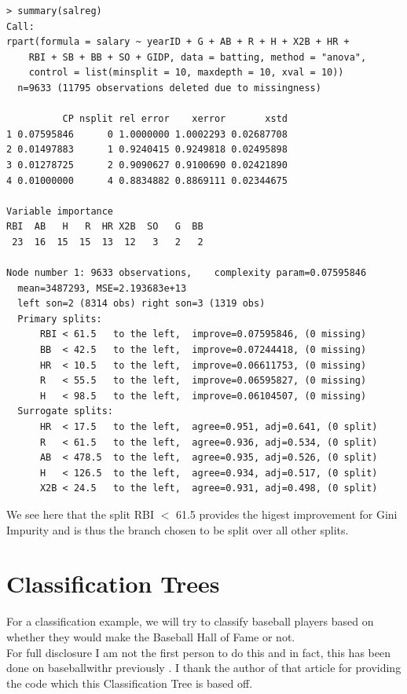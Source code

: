 \documentclass[11pt,a4paper]{report}
\begin{document}
\begin{lstlisting}[basicstyle=\scriptsize]
> summary(salreg)
Call:
rpart(formula = salary ~ yearID + G + AB + R + H + X2B + HR + 
    RBI + SB + BB + SO + GIDP, data = batting, method = "anova", 
    control = list(minsplit = 10, maxdepth = 10, xval = 10))
  n=9633 (11795 observations deleted due to missingness)

          CP nsplit rel error    xerror       xstd
1 0.07595846      0 1.0000000 1.0002293 0.02687708
2 0.01497883      1 0.9240415 0.9249818 0.02495898
3 0.01278725      2 0.9090627 0.9100690 0.02421890
4 0.01000000      4 0.8834882 0.8869111 0.02344675

Variable importance
RBI  AB   H   R  HR X2B  SO   G  BB 
 23  16  15  15  13  12   3   2   2 

Node number 1: 9633 observations,    complexity param=0.07595846
  mean=3487293, MSE=2.193683e+13 
  left son=2 (8314 obs) right son=3 (1319 obs)
  Primary splits:
      RBI < 61.5   to the left,  improve=0.07595846, (0 missing)
      BB  < 42.5   to the left,  improve=0.07244418, (0 missing)
      HR  < 10.5   to the left,  improve=0.06611753, (0 missing)
      R   < 55.5   to the left,  improve=0.06595827, (0 missing)
      H   < 98.5   to the left,  improve=0.06104507, (0 missing)
  Surrogate splits:
      HR  < 17.5   to the left,  agree=0.951, adj=0.641, (0 split)
      R   < 61.5   to the left,  agree=0.936, adj=0.534, (0 split)
      AB  < 478.5  to the left,  agree=0.935, adj=0.526, (0 split)
      H   < 126.5  to the left,  agree=0.934, adj=0.517, (0 split)
      X2B < 24.5   to the left,  agree=0.931, adj=0.498, (0 split)

\end{lstlisting}
We see here that the split RBI $<$ 61.5 provides the higest improvement for Gini Impurity and is thus the branch chosen to be split over all other splits.



\section{Classification Trees}
For a classification example, we will try to classify baseball players based on whether they would make the Baseball Hall of Fame or not.\\
For full disclosure I am not the first person to do this and in fact, this has been done on baseballwithr previously \cite{hofclass}. I thank the author of that article for providing the code which this Classification Tree is based off.
\end{document}
